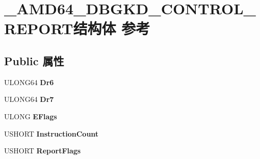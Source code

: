 \hypertarget{struct___a_m_d64___d_b_g_k_d___c_o_n_t_r_o_l___r_e_p_o_r_t}{}\section{\+\_\+\+A\+M\+D64\+\_\+\+D\+B\+G\+K\+D\+\_\+\+C\+O\+N\+T\+R\+O\+L\+\_\+\+R\+E\+P\+O\+R\+T结构体 参考}
\label{struct___a_m_d64___d_b_g_k_d___c_o_n_t_r_o_l___r_e_p_o_r_t}
\subsection*{Public 属性}
\begin{DoxyCompactItemize}
\item 
\mbox{\label{struct___a_m_d64___d_b_g_k_d___c_o_n_t_r_o_l___r_e_p_o_r_t_a9b89d3ec01613f95382998262504ab7e}} 
U\+L\+O\+N\+G64 {\bfseries Dr6}
\item 
\mbox{\label{struct___a_m_d64___d_b_g_k_d___c_o_n_t_r_o_l___r_e_p_o_r_t_ab362c9e179080ededf2ca5c75d240aad}} 
U\+L\+O\+N\+G64 {\bfseries Dr7}
\item 
\mbox{\label{struct___a_m_d64___d_b_g_k_d___c_o_n_t_r_o_l___r_e_p_o_r_t_ace90f3abfff748afca722bc272b935c8}} 
U\+L\+O\+NG {\bfseries E\+Flags}
\item 
\mbox{\label{struct___a_m_d64___d_b_g_k_d___c_o_n_t_r_o_l___r_e_p_o_r_t_a2f1da511ad24db6889d84718429115f7}} 
U\+S\+H\+O\+RT {\bfseries Instruction\+Count}
\item 
\mbox{\label{struct___a_m_d64___d_b_g_k_d___c_o_n_t_r_o_l___r_e_p_o_r_t_aeaeaa9603ed5c33aec5d3d81dbf9f6d2}} 
U\+S\+H\+O\+RT {\bfseries Report\+Flags}
\item 
\mbox{\label{struct___a_m_d64___d_b_g_k_d___c_o_n_t_r_o_l___r_e_p_o_r_t_ac7ef97fe638d345cf91934239f6835a2}} 

\end{DoxyCompactItemize}
